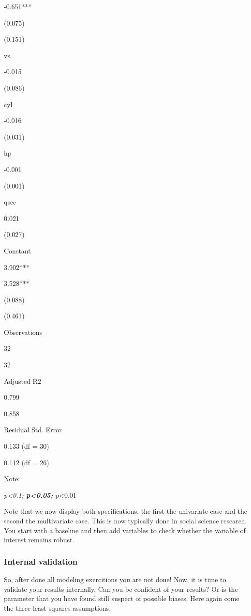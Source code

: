 \documentclass[]{article}
\theoremstyle{definition}
\theoremstyle{definition}
\theoremstyle{definition}
\theoremstyle{remark}
\begin{document}
-0.651***

(0.075)

(0.151)

vs

-0.015

(0.086)

cyl

-0.016

(0.031)

hp

-0.001

(0.001)

qsec

0.021

(0.027)

Constant

3.902***

3.528***

(0.088)

(0.461)

Observations

32

32

Adjusted R2

0.799

0.858

Residual Std. Error

0.133 (df = 30)

0.112 (df = 26)

Note:

\emph{p\textless{}0.1; \textbf{p\textless{}0.05; }}p\textless{}0.01

Note that we now display both specifications, the first the univariate
case and the second the multivariate case. This is now typically done in
social science research. You start with a baseline and then add
variables to check whether the variable of interest remains robust.

\subsubsection{Internal validation}\label{internal-validation}

So, after done all modeling exercitions you are not done! Now, it is
time to validate your results internally. Can you be confident of your
results? Or is the parameter that you have found still suspect of
possible biases. Here again come the three least squares assumptions:
\end{document}

